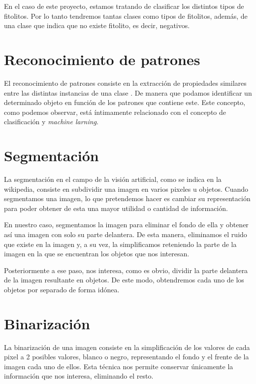 En el caso de este proyecto, estamos tratando de clasificar los distintos tipos de fitolitos. Por lo tanto tendremos tantas clases como tipos de fitolitos, además, de una clase que indica    que no existe fitolito, es decir, negativos.

\section{Reconocimiento de patrones}

El reconocimiento de patrones consiste en la extracción de propiedades similares entre las distintas instancias de una clase \cite{wiki:patternrecognition}. De manera que podamos identificar un determinado objeto en función de los patrones que contiene este. Este concepto, como podemos observar, está íntimamente relacionado con el concepto de clasificación y \textit{machine larning}.

\section{Segmentación}

La segmentación en el campo de la visión artificial, como se indica en la wikipedia, consiste en subdividir una imagen en varios pixeles u objetos. \cite{wiki:segmentation}
Cuando segmentamos una imagen, lo que pretendemos hacer es cambiar su representación para poder obtener de esta una mayor utilidad o cantidad de información.

En nuestro caso, segmentamos la imagen para eliminar el fondo de ella y obtener así una imagen con solo su parte delantera. De esta manera, eliminamos el ruido que existe en la imagen y, a su vez, la simplificamos reteniendo la parte de la imagen en la que se encuentran los objetos que nos interesan.

Posteriormente a ese paso, nos interesa, como es obvio, dividir la parte delantera de la imagen resultante en objetos. De este modo, obtendremos cada uno de los objetos por separado de forma idónea.

\section{Binarización}

La binarización de una imagen consiste en la simplificación de los valores de cada pixel a 2 posibles valores, blanco o negro, representando el fondo y el frente de la imagen cada uno de ellos. Esta técnica nos permite conservar únicamente la información que nos interesa, eliminando el resto.


